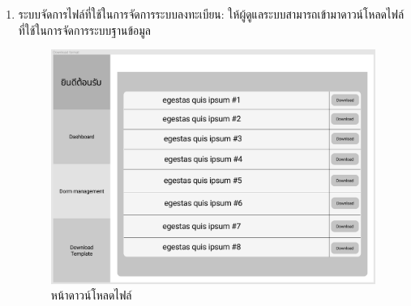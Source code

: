 \begin{enumerate}
  \clearpage
  \item ระบบจัดการไฟล์ที่ใช้ในการจัดการระบบลงทะเบียน: ให้ผู้ดูแลระบบสามารถเข้ามาดาวน์โหลดไฟล์ที่ใช้ในการจัดการระบบฐานข้อมูล
  \begin{figure}[h]
  \begin{center}
  \includegraphics[width=\linewidth]{photo/format.png}
  \end{center}
  \caption{หน้าดาวน์โหลดไฟล์}
  \label{fig:format-db}
  \end{figure}
\end{enumerate}
